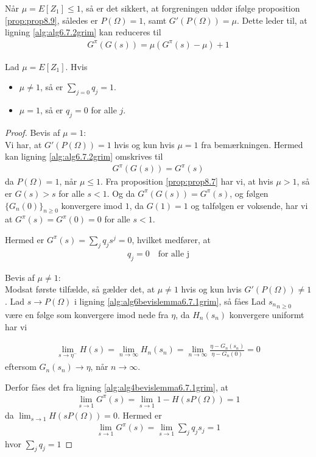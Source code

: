 \begin{rem}
Når $\mu=E[Z_1] \leq 1$, så er det sikkert, at forgreningen uddør ifølge proposition \ref{prop:prop8.9}, således er $P(\Omega)=1$, samt $G'(P(\Omega))=\mu$. Dette leder til, at ligning \eqref{alg:alg6.7.2grim} kan reduceres til 
\begin{align*}
    G^\pi(G(s))=\mu (G^\pi(s)-\mu)+1
\end{align*}
\end{rem}
\begin{cor} \label{cor:cor6.7.7grim}
Lad $\mu=E[Z_1]$. Hvis 
\begin{itemize}
    \item $\mu \neq 1$, så er $\sum_{j=0}q_j=1$. 
    \item $\mu=1$, så er $q_j=0$ for alle $j$. 
\end{itemize}
\end{cor}
\begin{proof}
Bevis af $\mu=1$:\\
Vi har, at $G'(P(\Omega))=1$ hvis og kun hvis $\mu=1$ fra bemærkningen. Hermed kan ligning \eqref{alg:alg6.7.2grim} omskrives til \begin{align*}
    G^\pi(G(s))=G^\pi(s)
\end{align*}
da $P(\Omega)=1$, når $\mu\leq1$. Fra proposition \ref{prop:prop8.7} har vi, at hvis $\mu > 1$, så er $G(s)>s$ for alle $s<1$. Og da $G^\pi(G(s)) =G^\pi(s)$, og følgen $\{G_n(0)\}_{n \geq 0}$ konvergere imod $1$, da $G(1) = 1$ og talfølgen er voksende, har vi at $G^\pi(s)=G^\pi(0)=0$ for alle $s<1$. 

Hermed er $G^\pi(s)=\sum_j q_j s^j =0$, hvilket medfører, at
\begin{align*}
    q_j=0 \quad \text{for alle j}
\end{align*}

Bevis af $\mu\neq1$:\\ 
Modsat første tilfælde, så gælder det, at $\mu\neq1$ hvis og kun hvis $G'(P(\Omega))\neq 1$. Lad $s\to P(\Omega)$ i ligning \eqref{alg:alg6bevislemma6.7.1grim}, så fåes
Lad ${s_n}_{n \geq 0}$ være en følge som konvergere imod nede fra $\eta$, da $H_n(s_n)$ konvergere uniformt har vi

\begin{align*}
    \lim_{s\to \eta^-}H(s)= \lim_{n \to \infty} H_n(s_n) = \lim_{n \to \infty} \frac{\eta - G_n(s_n)}{\eta - G_n(0)} = 0
\end{align*}
eftersom $G_n(s_n) \to \eta$, når $n \to \infty$.

Derfor fåes det fra ligning \eqref{alg:alg4bevislemma6.7.1grim}, at
\begin{align*}
    \lim_{s\to 1} G^\pi(s)=\lim_{s\to 1} 1-H(sP(\Omega))=1 
\end{align*}
da $\lim_{s\to 1} H(sP(\Omega))=0$. Hermed
er
\begin{align*}
    \lim_{s\to 1} G^\pi(s)=\lim_{s\to 1} \sum_j q_js_j =1
\end{align*}
hvor $\sum_j q_j=1$
\end{proof}

